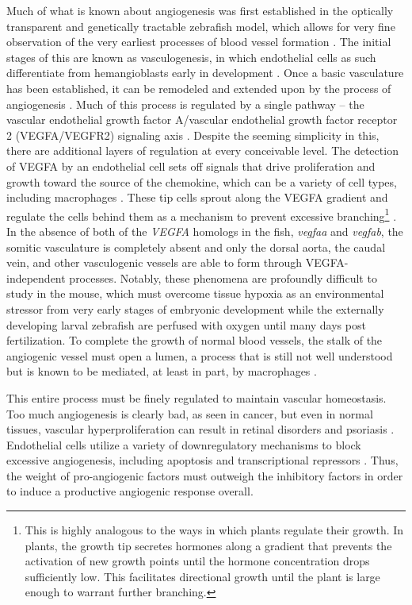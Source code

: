 Much of what is known about angiogenesis was first established in the optically transparent and genetically tractable zebrafish model, which allows for very fine observation of the very earliest processes of blood vessel formation \citep{Chan2002, Chavez2016}. The initial stages of this are known as vasculogenesis, in which endothelial cells as such differentiate from hemangioblasts early in development \citep{Vogeli2006, Bertrand2009}. Once a basic vasculature has been established, it can be remodeled and extended upon by the process of angiogenesis \citep{Koch2012}. Much of this process is regulated by a single pathway -- the vascular endothelial growth factor A/vascular endothelial growth factor receptor 2 (VEGFA/VEGFR2) signaling axis \citep{Olsson2006, Chung2011, Villanueva2016}. Despite the seeming simplicity in this, there are additional layers of regulation at every conceivable level. The detection of VEGFA by an endothelial cell sets off signals that drive proliferation and growth toward the source of the chemokine, which can be a variety of cell types, including macrophages \citep{Olsson2006}. These tip cells sprout along the VEGFA gradient and regulate the cells behind them as a mechanism to prevent excessive branching\footnote{This is highly analogous to the ways in which plants regulate their growth. In plants, the growth tip secretes hormones along a gradient that prevents the activation of new growth points until the hormone concentration drops sufficiently low. This facilitates directional growth until the plant is large enough to warrant further branching.} \citep{Sakabe2017, Tammela2011}. In the absence of both of the \textit{VEGFA} homologs in the fish, \textit{vegfaa} and \textit{vegfab}, the somitic vasculature is completely absent and only the dorsal aorta, the caudal vein, and other vasculogenic vessels are able to form through VEGFA-independent processes. Notably, these phenomena are profoundly difficult to study in the mouse, which must overcome tissue hypoxia as an environmental stressor from very early stages of embryonic development while the externally developing larval zebrafish are perfused with oxygen until many days post fertilization. To complete the growth of normal blood vessels, the stalk of the angiogenic vessel must open a lumen, a process that is still not well understood but is known to be mediated, at least in part, by macrophages \citep{Gerri2017}. 

This entire process must be finely regulated to maintain vascular homeostasis. Too much angiogenesis is clearly bad, as seen in cancer, but even in normal tissues, vascular hyperproliferation can result in retinal disorders and psoriasis \citep{Bisht2010, Malecic2017, Gupta2005}. Endothelial cells utilize a variety of downregulatory mechanisms to block excessive angiogenesis, including apoptosis and transcriptional repressors \citep{BenShoham2012, Chavakis2002, GarciaBarros2003, Duval2003, Dimmeler2002, Stefanec2000}. Thus, the weight of pro\hyp{}angiogenic factors must outweigh the inhibitory factors in order to induce a productive angiogenic response overall. 

